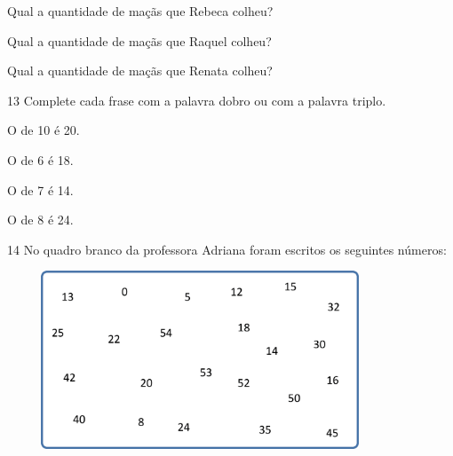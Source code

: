 
\begin{escolha}
\item Qual a quantidade de maçãs que Rebeca colheu?

\reduline{5\hfill}

\item Qual a quantidade de maçãs que Raquel colheu?


\item Qual a quantidade de maçãs que Renata colheu?

\end{escolha}

\num{13} Complete cada frase com a palavra dobro ou com a palavra triplo.

\begin{escolha}
\item
  O  de 10 é 20.
\item
  O  de 6 é 18.
\item
  O  de 7 é 14.
\item
  O  de 8 é 24.
\end{escolha}

\num{14} No quadro branco da professora Adriana foram escritos os seguintes números:


\includegraphics[width=4.51706in,height=2.09185in]{media/image25.png}


